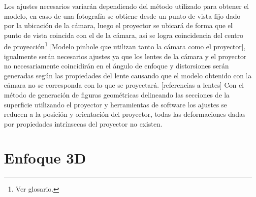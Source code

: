 Los ajustes necesarios variarán dependiendo del método utilizado para obtener el modelo, en caso de una fotografía se obtiene desde un punto de vista fijo dado por la ubicación de la cámara, luego el proyector se ubicará de forma que el punto de vista coincida con el de la cámara, así se logra coincidencia del centro de proyección\footnote{Ver glosario.} [Modelo pinhole que utilizan tanto la cámara como el proyector], igualmente serán necesarios ajustes ya que los lentes de la cámara y el proyector no necesariamente coincidirán en el ángulo de enfoque y distorsiones serán generadas según las propiedades del lente causando que el modelo obtenido con la cámara no se corresponda con lo que se proyectará. [referencias a lentes]
Con el método de generación de figuras geométricas delineando las secciones de la superficie utilizando el proyector y herramientas de software los ajustes se reducen a la posición y orientación del proyector, todas las deformaciones dadas por propiedades intrínsecas del proyector no existen.

\section{Enfoque 3D}